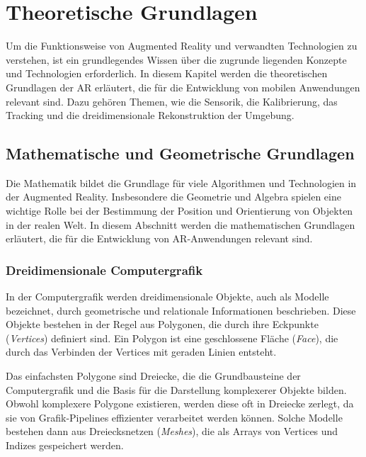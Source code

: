 \chapter{Theoretische Grundlagen}

Um die Funktionsweise von Augmented Reality und verwandten Technologien zu verstehen, ist ein grundlegendes Wissen über die zugrunde liegenden Konzepte und Technologien erforderlich. In diesem Kapitel werden die theoretischen Grundlagen der AR erläutert, die für die Entwicklung von mobilen Anwendungen relevant sind. Dazu gehören Themen, wie die Sensorik, die Kalibrierung, das Tracking und die dreidimensionale Rekonstruktion der Umgebung. \cite{doerner2022virtual}

\section{Mathematische und Geometrische Grundlagen}

Die Mathematik bildet die Grundlage für viele Algorithmen und Technologien in der Augmented Reality. Insbesondere die Geometrie und Algebra spielen eine wichtige Rolle bei der Bestimmung der Position und Orientierung von Objekten in der realen Welt. In diesem Abschnitt werden die mathematischen Grundlagen erläutert, die für die Entwicklung von AR-Anwendungen relevant sind.

\subsection{Dreidimensionale Computergrafik}

In der Computergrafik werden dreidimensionale Objekte, auch als Modelle bezeichnet, durch geometrische und relationale Informationen beschrieben. Diese Objekte bestehen in der Regel aus Polygonen, die durch ihre Eckpunkte (\emph{Vertices}) definiert sind. Ein Polygon ist eine geschlossene Fläche (\emph{Face}), die durch das Verbinden der Vertices mit geraden Linien entsteht. \cite{wikipedia2023polygons, espinoza2024graphics}

Das einfachsten Polygone sind Dreiecke, die die Grundbausteine der Computergrafik und die Basis für die Darstellung komplexerer Objekte bilden. Obwohl komplexere Polygone existieren, werden diese oft in Dreiecke zerlegt, da sie von Grafik-Pipelines effizienter verarbeitet werden können. Solche Modelle bestehen dann aus Dreiecksnetzen (\emph{Meshes}), die als Arrays von Vertices und Indizes gespeichert werden. \cite{wikipedia2023polygons, espinoza2024graphics}

